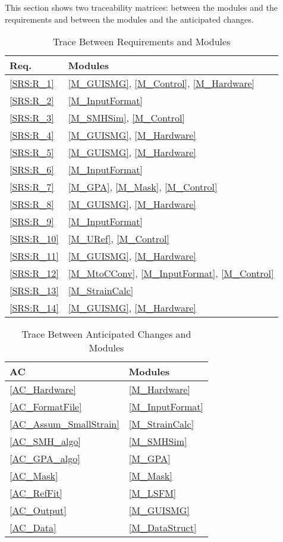 \documentclass[12pt, titlepage]{article}
\begin{document}
This section shows two traceability matrices: between the modules and the
requirements and between the modules and the anticipated changes.

\begin{table}[H]
\centering
\begin{tabular}{p{} p{}}
\toprule
\textbf{Req.} & \textbf{Modules}\\
\midrule
\cref{SRS:R_1} & \cref{M_GUISMG}, \cref{M_Control}, \cref{M_Hardware} \\
\cref{SRS:R_2} & \cref{M_InputFormat} \\
\cref{SRS:R_3} & \cref{M_SMHSim}, \cref{M_Control} \\
\cref{SRS:R_4} & \cref{M_GUISMG}, \cref{M_Hardware} \\
\cref{SRS:R_5} & \cref{M_GUISMG}, \cref{M_Hardware} \\
\cref{SRS:R_6} & \cref{M_InputFormat} \\
\cref{SRS:R_7} & \cref{M_GPA}, \cref{M_Mask}, \cref{M_Control} \\
\cref{SRS:R_8} & \cref{M_GUISMG}, \cref{M_Hardware} \\
\cref{SRS:R_9} & \cref{M_InputFormat} \\
\cref{SRS:R_10} & \cref{M_URef}, \cref{M_Control} \\
\cref{SRS:R_11} & \cref{M_GUISMG}, \cref{M_Hardware} \\
\cref{SRS:R_12} & \cref{M_MtoCConv}, \cref{M_InputFormat}, \cref{M_Control} \\
\cref{SRS:R_13} & \cref{M_StrainCalc} \\
\cref{SRS:R_14} & \cref{M_GUISMG}, \cref{M_Hardware}\\
\bottomrule
\end{tabular}
\caption{Trace Between Requirements and Modules}
\label{TblRT}
\end{table}

\begin{table}[H]
\centering
\begin{tabular}{p{} p{}}
\toprule
\textbf{AC} & \textbf{Modules}\\
\midrule
\cref{AC_Hardware} & \cref{M_Hardware}\\
\cref{AC_FormatFile} & \cref{M_InputFormat}\\
\cref{AC_Assum_SmallStrain} & \cref{M_StrainCalc}\\
\cref{AC_SMH_algo} & \cref{M_SMHSim}\\
\cref{AC_GPA_algo} & \cref{M_GPA}\\
\cref{AC_Mask} & \cref{M_Mask}\\
\cref{AC_RefFit} & \cref{M_LSFM}\\
\cref{AC_Output} & \cref{M_GUISMG}\\
\cref{AC_Data} & \cref{M_DataStruct}\\
\bottomrule
\end{tabular}
\caption{Trace Between Anticipated Changes and Modules}
\label{TblACT}
\end{table}
\end{document}
